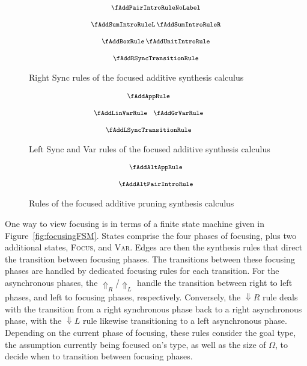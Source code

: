 \begin{figure}[H]
  \begin{align*}
    {\footnotesize{
\begin{array}{c}
  \fAddPairIntroRuleNoLabel
  \\[1.25em]
  \fAddSumIntroRuleL
  \,
  \fAddSumIntroRuleR
  \\[1.25em]
  \fAddBoxRule
  \,
  \fAddUnitIntroRule
  \\[1.25em]
  \fAddRSyncTransitionRule
  \end{array}
    }}
  \end{align*}
  \caption{Right Sync rules of the focused additive synthesis calculus}
  \label{fig:focus-add-right-sync}
\end{figure}

\begin{figure}[H]
  \begin{align*}
    {\footnotesize{
\hspace{-2em}\begin{array}{c}
  \fAddAppRule
  \\[1.25em]
  \fAddLinVarRule
  \;\;\;
  \fAddGrVarRule
  \\[1.25em]
  \fAddLSyncTransitionRule
  \end{array}
    }}
  \end{align*}
  \caption{Left Sync and Var rules of the focused additive synthesis calculus}
  \label{fig:focus-add-left-sync}
\end{figure}

\begin{figure}[H]
  \begin{align*}
    {\footnotesize{
\begin{array}{c}
\fAddAltAppRule
  \\[1.25em]
\fAddAltPairIntroRule
  \end{array}
    }}
  \end{align*}
  \caption{Rules of the focused additive pruning synthesis calculus}
  \label{fig:focus-add-pruning}
\end{figure}

One way to view focusing is in terms of a finite state machine given in
Figure~\ref{fig:focusingFSM}. States comprise the four phases of focusing, plus
two additional states, \textsc{Focus}, and \textsc{Var}. Edges are then the
synthesis rules that direct the transition between focusing phases. The
transitions between these focusing phases are handled by dedicated focusing
rules for each transition. For the asynchronous phases, the
$\Uparrow_{R}$/$\Uparrow_{L}$ handle the transition between right to left
phases, and left to focusing phases, respectively. Conversely, the
$\Downarrow{R}$ rule deals with the transition from a right synchronous phase
back to a right asynchronous phase, with the $\Downarrow{L}$ rule likewise
transitioning to a left asynchronous phase. Depending on the current phase of
focusing, these rules consider the goal type, the assumption currently being
focused on's type, as well as the size of $\Omega$, to decide when to transition
between focusing phases. 

